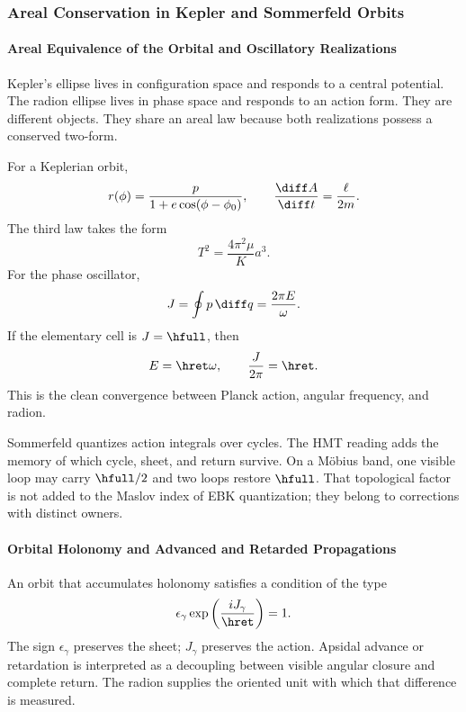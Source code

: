 \subsubsection{Areal Conservation in Kepler and Sommerfeld Orbits}

\paragraph{Areal Equivalence of the Orbital and Oscillatory Realizations}

Kepler's ellipse lives in configuration space and responds to a central
potential. The radion ellipse lives in phase space and responds to an action
form. They are different objects. They share an areal law because both
realizations possess a conserved two-form.

For a Keplerian orbit,
\begin{equation}
r(\phi)=\frac{p}{1+e\cos(\phi-\phi_0)},
\qquad
\frac{\diff A}{\diff t}=\frac{\ell}{2m}.
\label{eq:kepler}
\end{equation}
The third law takes the form
\[
T^2=\frac{4\pi^2\mu}{K}a^3.
\]
For the phase oscillator,
\begin{equation}
J=\oint p\,\diff q=\frac{2\pi E}{\omega}.
\label{eq:osc-action}
\end{equation}
If the elementary cell is \(J=\hfull\), then
\begin{equation}
E=\hret\omega,\qquad \frac{J}{2\pi}=\hret.
\label{eq:E-hbarw}
\end{equation}
This is the clean convergence between Planck action, angular frequency, and radion.

Sommerfeld quantizes action integrals over cycles. The HMT reading adds
the memory of which cycle, sheet, and return survive. On a Möbius band,
one visible loop may carry \(\hfull/2\) and two loops restore \(\hfull\).
That topological factor is not added to the Maslov index of EBK quantization;
they belong to corrections with distinct owners.

\paragraph{Orbital Holonomy and Advanced and Retarded Propagations}

An orbit that accumulates holonomy satisfies a condition of the type
\begin{equation}
\epsilon_\gamma\exp\left(\frac{iJ_\gamma}{\hret}\right)=1.
\label{eq:holonomy-action}
\end{equation}
The sign \(\epsilon_\gamma\) preserves the sheet; \(J_\gamma\) preserves the action. Apsidal advance or retardation is interpreted as a decoupling between visible angular closure and complete return. The radion supplies the oriented unit with which that difference is measured.


